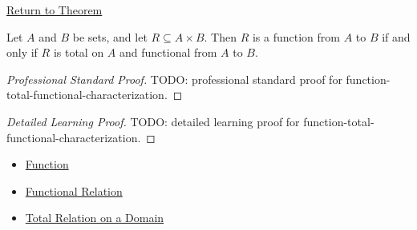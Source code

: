 \newpage
{}
\label{prf:function-total-functional-characterization}

\begin{remark*}[Return]
\hyperref[thm:function-total-functional-characterization]{Return to Theorem}
\end{remark*}

\begin{theorem*}
Let $A$ and $B$ be sets, and let $R\subseteq A\times B$. Then $R$ is a
function from $A$ to $B$ if and only if $R$ is total on $A$ and functional
from $A$ to $B$.
\end{theorem*}

\begin{proof}[Professional Standard Proof]
\LRAProofBodyStart
TODO: professional standard proof for function-total-functional-characterization.
\end{proof}

\begin{proof}[Detailed Learning Proof]
\LRAProofBodyStart
TODO: detailed learning proof for function-total-functional-characterization.
\end{proof}

\begin{remark*}

\end{remark*}

\begin{dependencies}
\begin{itemize}
  \item \hyperref[def:function]{Function}
  \item \hyperref[def:functional-relation]{Functional Relation}
  \item \hyperref[def:total-relation-on-domain]{Total Relation on a Domain}
\end{itemize}
\end{dependencies}

\clearpage
